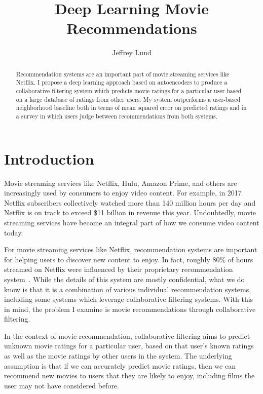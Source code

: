 \documentclass[12pt]{article}
\begin{document}
\title{Deep Learning Movie Recommendations}
\author{Jeffrey Lund}
\date{}
\maketitle

\begin{abstract}
Recommendation systems are an important part of movie streaming services like
Netflix.
I propose a deep learning approach based on autoencoders to produce a
collaborative filtering system which predicts movie ratings for a particular
user based on a large database of ratings from other users.
My system outperforms a user-based neighborhood baseline both in terms of mean
squared error on predicted ratings and in a survey in which users judge
between recommendations from both systems.
\end{abstract}

\section{Introduction}
\label{sec:intro}

Movie streaming services like Netflix, Hulu, Amazon Prime, and
others are increasingly used by consumers to enjoy video content.
For example, in 2017 Netflix subscribers collectively watched more than 140
million hours per day and Netflix is on track to exceed \$11 billion in revenue
this year.
Undoubtedly, movie streaming services have become an integral
part of how we consume video content today.

For movie streaming services like Netflix, recommendation systems are
important for helping users to discover new content to enjoy.
In fact, roughly 80\% of hours streamed on Netflix were influenced by their
proprietary recommendation system~\cite{netflix}.
While the details of this system are mostly confidential, what we do know is
that it is a combination of various individual recommendation systems,
including some systems which leverage collaborative filtering systems.
With this in mind, the problem I examine is movie recommendations through
collaborative filtering.

In the context of movie recommendation, collaborative filtering aims to predict
unknown movie ratings for a particular user, based on that user's known ratings
as well as the movie ratings by other users in the system.
The underlying assumption is that if we can accurately predict movie ratings,
then we can recommend new movies to users that they are
likely to enjoy, including films the user may not have considered before.
\end{document}
